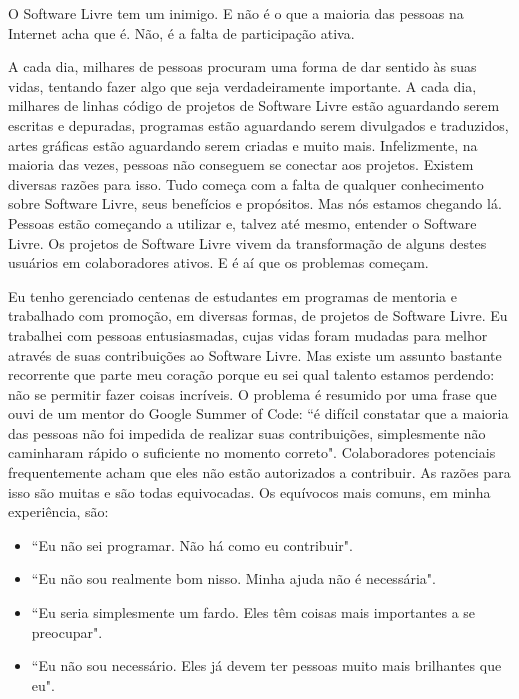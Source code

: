 

\noindent{}O Software Livre tem um inimigo. E não é o que a maioria das pessoas na Internet acha
que é. Não, é a falta de participação ativa.

A cada dia, milhares de pessoas procuram uma forma de dar sentido às suas vidas,
tentando fazer algo que seja verdadeiramente importante. A cada dia, milhares
de linhas código de projetos de Software Livre estão aguardando serem escritas e
depuradas, programas estão aguardando serem divulgados e traduzidos, artes gráficas
estão aguardando serem criadas e muito mais. Infelizmente, na maioria das vezes, pessoas
não conseguem se conectar aos projetos. Existem diversas razões para isso. Tudo começa
com a falta de qualquer conhecimento sobre Software Livre, seus benefícios e propósitos.
Mas nós estamos chegando lá. Pessoas estão começando a utilizar e, talvez até mesmo,
entender o Software Livre. Os projetos de Software Livre vivem da transformação
de alguns destes usuários em colaboradores ativos. E é aí que os problemas começam.

Eu tenho gerenciado centenas de estudantes em programas de mentoria e trabalhado com
promoção, em diversas formas, de projetos de Software Livre. Eu trabalhei com pessoas
entusiasmadas, cujas vidas foram mudadas para melhor através de suas contribuições
ao Software Livre. Mas existe um assunto bastante recorrente que parte meu coração porque
eu sei qual talento estamos perdendo: não se permitir fazer coisas incríveis. O
problema é resumido por uma frase que ouvi de um mentor do Google Summer of Code: ``é
difícil constatar que a maioria das pessoas não foi impedida de realizar suas contribuições,
simplesmente não caminharam rápido o suficiente no momento correto". Colaboradores potenciais
frequentemente acham que eles não estão autorizados a contribuir. As razões para isso são
muitas e são todas equivocadas. Os equívocos mais comuns, em minha experiência, são:

\begin{itemize}
 \item ``Eu não sei programar. Não há como eu contribuir".
 \item ``Eu não sou realmente bom nisso. Minha ajuda não é necessária".
 \item ``Eu seria simplesmente um fardo. Eles têm coisas mais importantes a se preocupar".
 \item ``Eu não sou necessário. Eles já devem ter pessoas muito mais brilhantes que eu".
\end{itemize}

